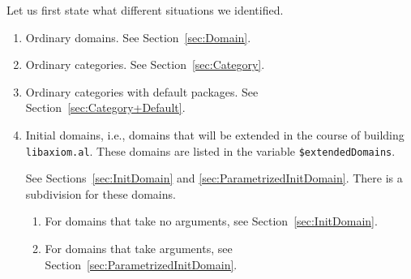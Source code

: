 \documentclass{article}
\newcommand{\file}[1]{\texttt{#1}}
\begin{document}
Let us first state what different situations we identified.
\begin{enumerate}
\item Ordinary domains. See Section~\ref{sec:Domain}.
\item Ordinary categories. See Section~\ref{sec:Category}.
\item Ordinary categories with default packages. See
  Section~\ref{sec:Category+Default}.
\item Initial domains, i.e., domains that will be extended in the
  course of building \file{libaxiom.al}. These domains are listed in
  the variable \verb'$extendedDomains'. %

  See Sections~\ref{sec:InitDomain} and
  \ref{sec:ParametrizedInitDomain}. There is a subdivision for these
  domains.
  \begin{enumerate}
  \item For domains that take no arguments, see
    Section~\ref{sec:InitDomain}.
  \item For domains that take arguments, see
    Section~\ref{sec:ParametrizedInitDomain}.
  \end{enumerate}
\end{enumerate}





\end{document}
